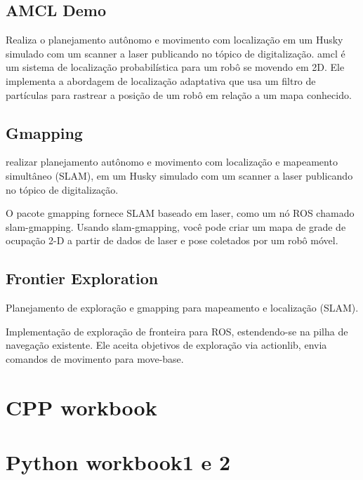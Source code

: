 \subsection{AMCL Demo}
Realiza o planejamento autônomo e movimento com localização em um Husky simulado com um scanner a laser publicando no tópico de digitalização.
amcl é um sistema de localização probabilística para um robô se movendo em 2D. Ele implementa a abordagem de localização adaptativa que usa um filtro de partículas para rastrear a posição de um robô em relação a um mapa conhecido.

\subsection{Gmapping}
realizar planejamento autônomo e movimento com localização e mapeamento simultâneo (SLAM), em um Husky simulado com um scanner a laser publicando no tópico de digitalização.

O pacote gmapping fornece SLAM baseado em laser, como um nó ROS chamado slam-gmapping. Usando slam-gmapping, você pode criar um mapa de grade de ocupação 2-D a partir de dados de laser e pose coletados por um robô móvel.
\subsection{Frontier Exploration}
Planejamento de exploração e gmapping para mapeamento e localização (SLAM).

Implementação de exploração de fronteira para ROS, estendendo-se na pilha de navegação existente. Ele aceita objetivos de exploração via actionlib, envia comandos de movimento para move-base.
 \section{CPP workbook}
 \section{Python workbook1 e 2}




